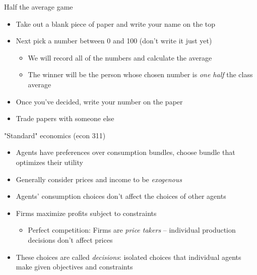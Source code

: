 \documentclass[10pt]{beamer}
\begin{document}
\begin{frame}[label={sec:org3a9827f}]{}
\alert{Half the average game}
\begin{itemize}
\item Take out a blank piece of paper and write your name on the top
\item Next pick a number between 0 and 100 (don't write it just yet)
\begin{itemize}
\item We will record all of the numbers and calculate the average
\item The winner will be the person whose chosen number is \emph{one half} the class average
\end{itemize}
\item Once you've decided, write your number on the paper
\item Trade papers with someone else
\end{itemize}
\end{frame}

\begin{frame}[label={sec:org37b4448}]{}
\alert{"Standard" economics (econ 311)}
\begin{itemize}
\item Agents have preferences over consumption bundles, choose bundle that optimizes their utility
\item Generally consider prices and income to be \emph{exogenous}
\item Agents' consumption choices don't affect the choices of other agents
\item Firms maximize profits subject to constraints
\begin{itemize}
\item Perfect competition: Firms are \emph{price takers} -- individual production decisions don't affect prices
\end{itemize}
\item These choices are called \emph{decisions}: isolated choices that individual agents make given objectives and constraints
\end{itemize}
\end{frame}
\end{document}
